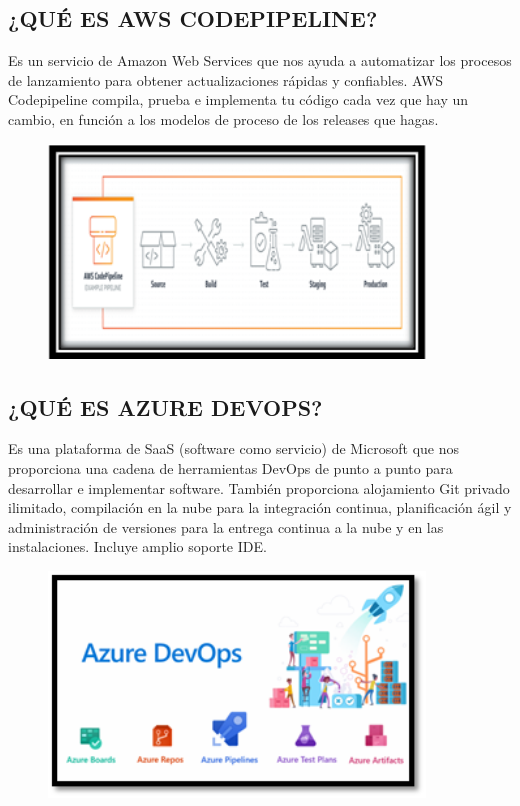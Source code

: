 \documentclass[12pt,letterpaper]{article}
\begin{document}
\subsection{¿QUÉ ES AWS CODEPIPELINE?}
Es un servicio de Amazon Web Services que nos 
ayuda a automatizar los procesos de lanzamiento para obtener actualizaciones rápidas y confiables. AWS Codepipeline compila, prueba e implementa tu código cada vez que hay un cambio, en función a los 
modelos de proceso de los releases que hagas.
\begin{figure}[h]
    \begin{center}
    \includegraphics[width=10cm]{./Imagenes/img1.png}
  
    \label{rg4}
    \end{center}
    \end{figure}

\subsection{¿QUÉ ES AZURE DEVOPS?}

    Es una plataforma de SaaS 
    (software como servicio) de Microsoft que nos proporciona una cadena de herramientas DevOps de punto a punto para desarrollar e implementar software. También proporciona alojamiento Git privado ilimitado, compilación en la nube para la integración continua, planificación ágil y administración de versiones 
    para la entrega continua a la nube y en las instalaciones. Incluye amplio soporte IDE.
    \begin{figure}[h]
        \begin{center}
        \includegraphics[width=10cm]{./Imagenes/img2.png}
   
        \label{rg4}
        \end{center}
        \end{figure}
\end{document}
